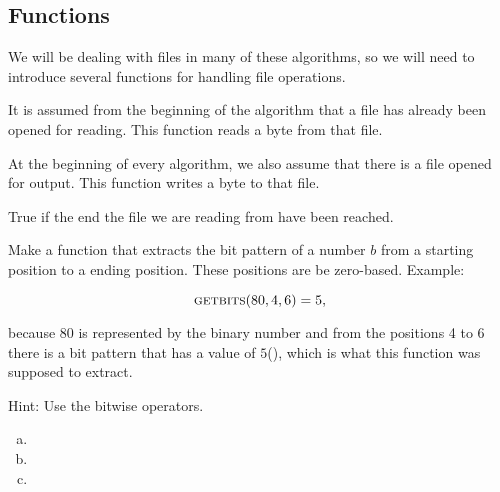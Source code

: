 \subsection{Functions}
\label{sec:pseudocode}

We will be dealing with files in many of these algorithms, so we will need
to introduce several functions for handling file operations.

\begin{description}[font=\normalfont]
\item[\VoidCall{ReadByte}] It is assumed from the beginning of the
  algorithm that a file has already been opened for reading. This
  function reads a byte from that file.

\item[\Call{WriteByte}{$\var{byte}$}] At the beginning of every algorithm,
  we also assume that there is a file opened for output. This function
  writes a byte to that file.

\item[\VoidCall{EndOfFileReached}] True if the end the file we are
  reading from have been reached.

\end{description}

\begin{Exercise}[label={getbits}]

  Make a function  that
  extracts the bit pattern of a number $b$ from a starting position to
  a ending position. These positions are be zero-based. Example:

  \begin{equation*}
    \Call{getbits}{80, 4, 6}=5,
  \end{equation*}

  because $80$ is represented
  by the binary number  and from the positions 4 to 6
  there is a bit pattern that has a value of $5$(), which is
  what this function was supposed to extract.

  Hint: Use the bitwise operators.

\end{Exercise}

\answers{}

\begin{Answer}[ref={n-to-bin}]
  \begin{enumerate}[(a)]
  \item {}
  \item {}
  \item {}
  \end{enumerate}
\end{Answer}

